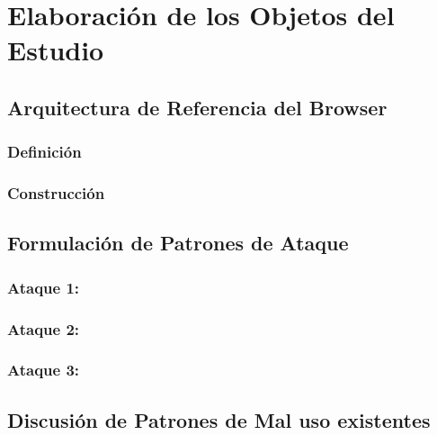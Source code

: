 \chapter{Elaboración de los Objetos del Estudio}
\label{chap:chap4}


\section{Arquitectura de Referencia del Browser}
\label{sec:chap4.1}

\subsection{Definición}
\label{sec:chap4.1.1}
%

\subsection{Construcción}
\label{sec:chap4.1.2}
%


\section{Formulación de Patrones de Ataque}
\label{sec:chap4.2}
%

\subsection{Ataque 1: }
\label{sec:chap4.2.1}
%

\subsection{Ataque 2: }
\label{sec:chap4.2.2}
%

\subsection{Ataque 3:}
\label{sec:chap4.2.3}
%

\section{Discusión de Patrones de Mal uso existentes}
\label{sec:chap4.3}
